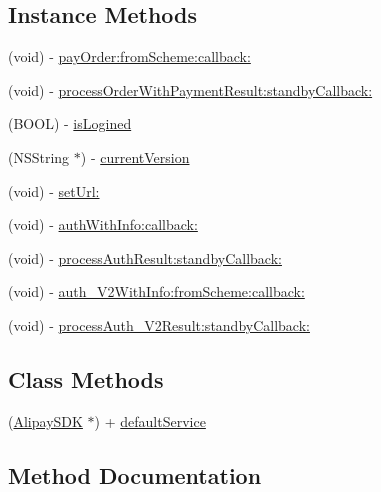 \subsection*{Instance Methods}
\begin{DoxyCompactItemize}
\item 
(void) -\/ \mbox{\hyperlink{interface_alipay_s_d_k_ab454a56d82c72b10d857b44213699386}{pay\+Order\+:from\+Scheme\+:callback\+:}}
\item 
(void) -\/ \mbox{\hyperlink{interface_alipay_s_d_k_a00d830efbcfdc889493db7e4e5b280b2}{process\+Order\+With\+Payment\+Result\+:standby\+Callback\+:}}
\item 
(B\+O\+OL) -\/ \mbox{\hyperlink{interface_alipay_s_d_k_a23441b8570f40e561a4b21c5adad14bf}{is\+Logined}}
\item 
(N\+S\+String $\ast$) -\/ \mbox{\hyperlink{interface_alipay_s_d_k_abe09d5468b13580065fd0b06df92c8b4}{current\+Version}}
\item 
(void) -\/ \mbox{\hyperlink{interface_alipay_s_d_k_a3397bb35d1eda5051f5081d5841f2d32}{set\+Url\+:}}
\item 
(void) -\/ \mbox{\hyperlink{interface_alipay_s_d_k_a59acbee9c3cc7237cba73419de321870}{auth\+With\+Info\+:callback\+:}}
\item 
(void) -\/ \mbox{\hyperlink{interface_alipay_s_d_k_a5ec0d508c6d3a16509a3336646cbe07a}{process\+Auth\+Result\+:standby\+Callback\+:}}
\item 
(void) -\/ \mbox{\hyperlink{interface_alipay_s_d_k_a8eb24fd6ba56b0d0fb88e12452f9fa23}{auth\+\_\+\+V2\+With\+Info\+:from\+Scheme\+:callback\+:}}
\item 
(void) -\/ \mbox{\hyperlink{interface_alipay_s_d_k_af20f1cdb587951f83f61fdab84dd5bde}{process\+Auth\+\_\+\+V2\+Result\+:standby\+Callback\+:}}
\end{DoxyCompactItemize}
\subsection*{Class Methods}
\begin{DoxyCompactItemize}
\item 
(\mbox{\hyperlink{interface_alipay_s_d_k}{Alipay\+S\+DK}} $\ast$) + \mbox{\hyperlink{interface_alipay_s_d_k_aee9e226315592b79d221e0cfd8959971}{default\+Service}}
\end{DoxyCompactItemize}


\subsection{Method Documentation}
\mbox{\label{interface_alipay_s_d_k_a8eb24fd6ba56b0d0fb88e12452f9fa23}} 
